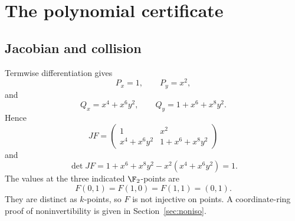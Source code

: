 \section{The polynomial certificate}\label{sec:polynomial}

\subsection{Jacobian and collision}

Termwise differentiation gives
\[
 P_x=1,\qquad P_y=x^2,
\]
and
\[
 Q_x=x^4+x^6y^2,\qquad Q_y=1+x^6+x^8y^2.
\]
Hence
\[
JF=
\begin{pmatrix}
1&x^2\\
x^4+x^6y^2&1+x^6+x^8y^2
\end{pmatrix}
\]
and
\[
\det JF
=1+x^6+x^8y^2-x^2(x^4+x^6y^2)=1.
\]
The values at the three indicated \(\F_2\)-points are
\[
 F(0,1)=F(1,0)=F(1,1)=(0,1).
\]
They are distinct as \(k\)-points, so \(F\) is not injective on points.  A
coordinate-ring proof of noninvertibility is given in
Section~\ref{sec:noniso}.

